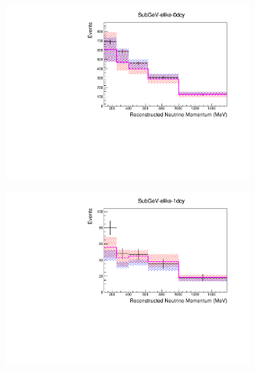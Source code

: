 \begin{figure}[h]
  \begin{subfigure}[t]{0.49\textwidth}
    \includegraphics[width=\textwidth, trim={0mm 0mm 0mm 0mm}, clip,page=1]{Figures/Selections/Predictive_SubGeV-elike-0dcy.pdf}
  \end{subfigure}%
  \begin{subfigure}[t]{0.49\textwidth}
    \includegraphics[width=\textwidth, trim={0mm 0mm 0mm 0mm}, clip,page=1]{Figures/Selections/Predictive_SubGeV-elike-1dcy.pdf}
  \end{subfigure}
  \begin{subfigure}[t]{0.49\textwidth}

\end{subfigure}
\end{figure}
